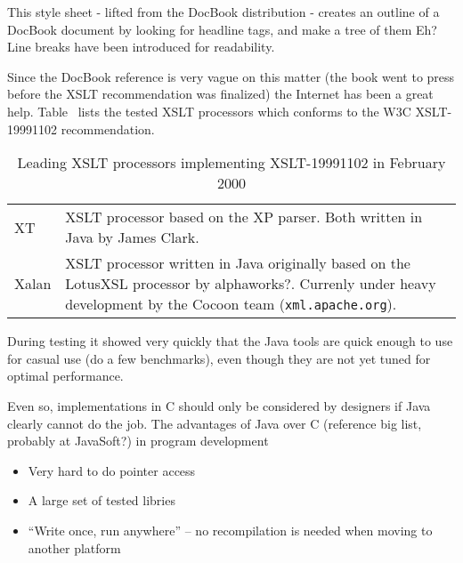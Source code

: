 This style sheet - lifted from the DocBook distribution - creates an
outline of a DocBook document by looking for headline tags, and make a
tree of them \textsf{Eh? }  Line breaks have been introduced for
readability.

{\small

}






Since the DocBook reference is very vague on this matter (the book
went to press before the XSLT recommendation was finalized) the
Internet has been a great help.
Table~ lists the tested XSLT
processors which conforms to the W3C XSLT-19991102 recommendation.  


\begin{table}[htbp]
  \begin{center}
    \begin{tabular}{|l|p{10cm}|}

      \hline\hline
      
      XT &  XSLT processor based on the XP parser.  Both
      written in Java\textsf{ by James Clark}. \\

      Xalan & XSLT processor written in Java originally based on the
      LotusXSL processor by \textsf{alphaworks?}.   Currenly under
      heavy development by the Cocoon team 
      (\texttt{xml.apache.org}). \\
      
      \hline
    \end{tabular}
    \caption{Leading XSLT processors implementing
      \textsf{XSLT-19991102} in February 2000} 
    \label{tab:leading-xslt-processors}
  \end{center}
\end{table}

During testing it showed very quickly that the Java tools are quick
enough to use for casual use (\textsf{do a few benchmarks}), even
though they are not yet tuned for optimal performance.


Even so, implementations in C
should only be considered by designers if Java clearly cannot do the
job.  The advantages of Java over C (\textsf{reference big list,
  probably at JavaSoft?}) in program development

\begin{itemize}
\item Very hard to do pointer access
\item A large set of tested libries
\item ``Write once, run anywhere'' -- no recompilation is needed when
  moving to another platform
\end{itemize}

